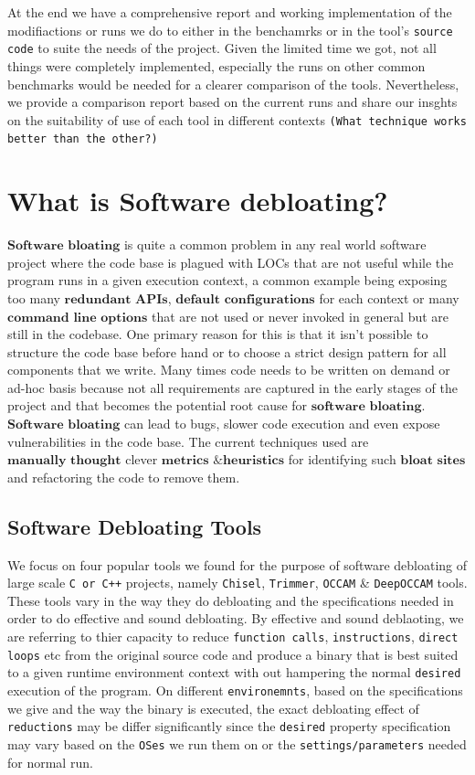 \documentclass{relatorio}
\begin{document}
At the end we have a comprehensive report and working implementation of the modifiactions or runs we do to either in the benchamrks or in the tool's 
\texttt{source code} to suite the needs of the project. Given the limited time we got, not all things were completely implemented, especially the runs on other common
benchmarks would be needed for a clearer comparison of the tools. Nevertheless, we provide a comparison report based on the current runs and share our insghts on the suitability
of use of each tool in different contexts \texttt{(What technique works better than the other?)} 

\section{What is Software debloating?}%

$\textbf{Software bloating}$ is quite a common problem in any real world software project where the code base is plagued with LOCs that are not useful while the program runs in a given execution context, a common example being exposing too many $\textbf{redundant APIs}$, $\textbf{default configurations}$ for each context or many $\textbf{command line options}$ that are not used or never invoked in general but are still in the codebase. One primary reason for this is that it isn't possible to structure the code base before hand or to choose a strict design pattern for all components that we write. Many times code needs to be written on demand or ad-hoc basis because not all requirements are captured in the early stages of the project and that becomes the potential root cause for $\textbf{software bloating}$. $\textbf{Software bloating}$ can lead to bugs, slower code execution and even expose vulnerabilities in the code base. The current techniques used are $\textbf{manually thought}$ clever $\textbf{metrics \& heuristics}$ for identifying such $\textbf{bloat sites}$ and refactoring the code to remove them. 

\subsection{Software Debloating Tools}%

We focus on four popular tools we found for the purpose of software debloating of large scale \texttt{C or C++} projects, namely \texttt{Chisel}, \texttt{Trimmer}, \texttt{OCCAM} \& \texttt{DeepOCCAM} tools. These tools vary in the way they do debloating and the specifications needed in order to do effective and sound debloating. By effective and sound deblaoting, we are referring to thier capacity to reduce \texttt{function calls}, \texttt{instructions}, \texttt{direct loops} etc from the original source code and produce a binary that is best suited to a given runtime 
environment context with out hampering the normal \texttt{desired} execution of the program. On different \texttt{environemnts}, based on the specifications we give and the way the binary is executed, the exact debloating effect of \texttt{reductions} may be differ significantly since the \texttt{desired} property specification may vary based on the \texttt{OSes} we run them on or the \texttt{settings/parameters} needed for normal run. 
\end{document}
